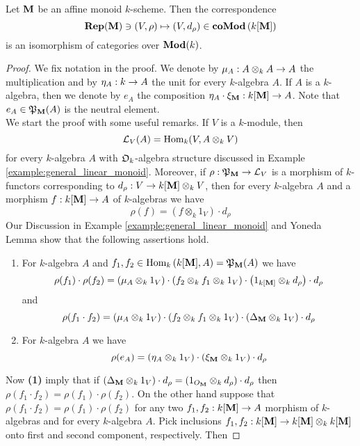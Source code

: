 \begin{theorem}\label{theorem:comodules_equivalent_to_representations}
Let $\mathbf{M}$ be an affine monoid $k$-scheme. Then the correspondence
$$\mathbf{Rep}(\mathbf{M}) \ni \left(V,\rho\right) \mapsto \left(V,d_{\rho}\right)\in \mathbf{coMod}\left(k[\mathbf{M}]\right)$$
is an isomorphism of categories over $\mathbf{Mod}(k)$.
\end{theorem}
\begin{proof}
We fix notation in the proof. We denote by $\mu_A:A\otimes_kA\rightarrow A$ the multiplication and by $\eta_A:k\rightarrow A$ the unit for every $k$-algebra $A$. If $A$ is a $k$-algebra, then we denote by $e_A$ the composition $\eta_A \cdot \xi_{\mathbf{M}}:k[\mathbf{M}]\rightarrow A$. Note that $e_A\in {\mathfrak P}_{\mathbf{M}}(A)$ is the neutral element.\\
We start the proof with some useful remarks. If $V$ is a $k$-module, then
$${\mathcal L}_V(A) = \mathrm{Hom}_k(V,A\otimes_kV)$$
for every $k$-algebra $A$ with ${\mathfrak O}_k$-algebra structure discussed in Example \ref{example:general_linear_monoid}. Moreover, if $\rho:{\mathfrak P}_{\mathbf{M}}\rightarrow {\mathcal L}_V$ is a morphism of $k$-functors corresponding to $d_{\rho}:V\rightarrow k[\mathbf{M}]\otimes_kV$, then for every $k$-algebra $A$ and a morphism $f:k[\mathbf{M}]\rightarrow A$ of $k$-algebras we have
$$\rho(f) = \left(f\otimes_k1_V\right)\cdot d_{\rho}$$
Our Discussion in Example \ref{example:general_linear_monoid} and Yoneda Lemma show that the following assertions hold.
\begin{enumerate}[label=\textbf{(\arabic*)}, leftmargin=1.5em]
\item For $k$-algebra $A$ and $f_1,f_2\in \mathrm{Hom}_k\left(k[\mathbf{M}],A\right) = {\mathfrak P}_{\mathbf{M}}(A)$ we have
$$\rho(f_1)\cdot \rho(f_2) = \left(\mu_A\otimes_k1_V\right)\cdot \left(f_2\otimes_kf_1\otimes_k1_V\right) \cdot \left(1_{k[\mathbf{M}]}\otimes_k d_{\rho}\right) \cdot d_{\rho}$$
and
$$\rho(f_1\cdot f_2)=\left(\mu_A\otimes_k1_V\right)\cdot \left(f_2\otimes_kf_1\otimes_k1_V \right)\cdot \left(\Delta_{\mathbf{M}}\otimes_k 1_V\right)\cdot d_{\rho}$$
\item For $k$-algebra $A$ we have
$$\rho(e_A) = \left(\eta_A\otimes_k 1_V\right)\cdot \left(\xi_{\mathbf{M}}\otimes_k 1_V\right) \cdot d_{\rho}$$
\end{enumerate}
Now \textbf{(1)} imply that if $\left(\Delta_{\mathbf{M}}\otimes_{k}1_V\right)\cdot d_{\rho}=\left(1_{O_{\mathbf{M}}}\otimes_{k}d_{\rho}\right)\cdot d_{\rho}$
then $\rho(f_1\cdot f_2) = \rho(f_1)\cdot \rho(f_2)$. On the other hand suppose that $\rho(f_1\cdot f_2) = \rho(f_1)\cdot \rho(f_2)$ for any two $f_1,f_2:k[\mathbf{M}]\rightarrow A$ morphism of $k$-algebras and for every $k$-algebra $A$. Pick inclusions $f_1,f_2:k[\mathbf{M}]\rightarrow k[\mathbf{M}]\otimes_kk[\mathbf{M}]$ onto first and second component, respectively. Then

\end{proof}
